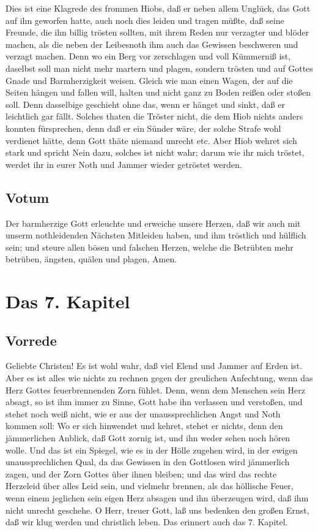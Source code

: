 Dies ist eine Klagrede des frommen Hiobs, daß er neben allem Unglück, das Gott auf ihn geworfen hatte, auch noch dies leiden und tragen müßte, daß seine Freunde, die ihn billig trösten sollten, mit ihrem Reden nur verzagter und blöder machen, als die neben der Leibesnoth ihm auch das Gewissen beschweren und verzagt machen. Denn wo ein Berg vor zerschlagen und voll Kümmerniß ist, daselbst soll man nicht mehr martern und plagen, sondern trösten und auf Gottes Gnade und Barmherzigkeit weisen. Gleich wie man einen Wagen, der auf die Seiten hängen und fallen will, halten und nicht ganz zu Boden reißen oder stoßen soll. Denn dasselbige geschieht ohne das, wenn er hänget und sinkt, daß er leichtlich gar fällt. Solches thaten die Tröster nicht, die dem Hiob nichts anders konnten fürsprechen, denn daß er ein Sünder wäre, der solche Strafe wohl verdienet hätte, denn Gott thäte niemand unrecht etc. Aber Hiob wehret sich stark und spricht Nein dazu, solches ist nicht wahr; darum wie ihr mich tröstet, werdet ihr in eurer Noth und Jammer wieder getröstet werden.

\section{Votum}

Der barmherzige Gott erleuchte und erweiche unsere Herzen, daß wir auch mit unserm nothleidenden Nächsten Mitleiden haben, und ihm tröstlich und hülflich sein; und steure allen bösen und falschen Herzen, welche die Betrübten mehr betrüben, ängsten, quälen und plagen, Amen.

\chapter{Das 7. Kapitel}

\section{Vorrede}

Geliebte Christen! Es ist wohl wahr, daß viel Elend und Jammer auf Erden ist. Aber es ist alles wie nichts zu rechnen gegen der greulichen Anfechtung, wenn das Herz Gottes feuerbrennenden Zorn fühlet. Denn, wenn dem Menschen sein Herz absagt, so ist ihm immer zu Sinne, Gott habe ihn verlassen und verstoßen, und stehet noch weiß nicht, wie er aus der unaussprechlichen Angst und Noth kommen soll: Wo er sich hinwendet und kehret, stehet er nichts, denn den jämmerlichen Anblick, daß Gott zornig ist, und ihn weder sehen noch hören wolle. Und das ist ein Spiegel, wie es in der Hölle zugehen wird, in der ewigen unaussprechlichen Qual, da das Gewissen in den Gottlosen wird jämmerlich zagen, und der Zorn Gottes über ihnen bleiben; und das wird das rechte Herzeleid über alles Leid sein, und vielmehr brennen, als das höllische Feuer, wenn einem jeglichen sein eigen Herz absagen und ihn überzeugen wird, daß ihm nicht unrecht geschehe. O Herr, treuer Gott, laß uns bedenken den großen Ernst, daß wir klug werden und christlich leben. Das erinnert auch das 7. Kapitel.

